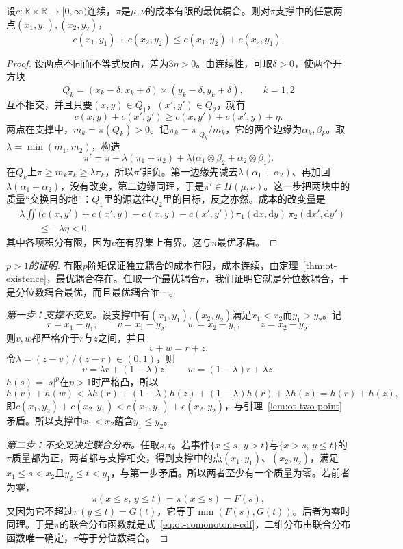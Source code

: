 \begin{lemma}[最优耦合不能局部改进]
\label{lem:ot-two-point}
设$c:\mathbb{R}\times\mathbb{R}\to[0,\infty)$连续，$\pi$是$\mu,\nu$的成本有限的最优耦合。则对$\pi$支撑中的任意两点$(x_1,y_1),(x_2,y_2)$，
\begin{equation}
 c(x_1,y_1)+c(x_2,y_2)\leq c(x_1,y_2)+c(x_2,y_1).
 \label{eq:ot-two-point}
\end{equation}
\end{lemma}

\begin{proof}
设两点不同而不等式反向，差为$3\eta>0$。由连续性，可取$\delta>0$，使两个开方块
\[
 Q_k=(x_k-\delta,x_k+\delta)\times(y_k-\delta,y_k+\delta),\qquad k=1,2
\]
互不相交，并且只要$(x,y)\in Q_1$，$(x',y')\in Q_2$，就有
\[
 c(x,y)+c(x',y')\geq c(x,y')+c(x',y)+\eta .
\]
两点在支撑中，$m_k=\pi(Q_k)>0$。记$\pi_k=\pi|_{Q_k}/m_k$，它的两个边缘为$\alpha_k,\beta_k$。取$\lambda=\min(m_1,m_2)$，构造
\[
 \pi'=\pi-\lambda(\pi_1+\pi_2)+\lambda\bigl(\alpha_1\otimes\beta_2+\alpha_2\otimes\beta_1\bigr).
\]
在$Q_k$上$\pi\geq m_k\pi_k\geq\lambda\pi_k$，所以$\pi'$非负。第一边缘先减去$\lambda(\alpha_1+\alpha_2)$、再加回$\lambda(\alpha_1+\alpha_2)$，没有改变，第二边缘同理，于是$\pi'\in\Pi(\mu,\nu)$。这一步把两块中的质量“交换目的地”：$Q_1$里的源送往$Q_2$里的目标，反之亦然。成本的改变量是
\[
 \begin{aligned}
 &\lambda\iint\bigl(c(x,y')+c(x',y)-c(x,y)-c(x',y')\bigr)\,\pi_1(\mathrm{d}x,\mathrm{d}y)\,\pi_2(\mathrm{d}x',\mathrm{d}y')\\
 &\qquad\leq-\lambda\eta<0 ,
 \end{aligned}
\]
其中各项积分有限，因为$c$在有界集上有界。这与$\pi$最优矛盾。
\end{proof}

\begin{proof}[$p>1$的证明]
有限$p$阶矩保证独立耦合的成本有限，成本连续，由定理~\ref{thm:ot-existence}，最优耦合存在。任取一个最优耦合$\pi$，我们证明它就是分位数耦合，于是分位数耦合最优，而且最优耦合唯一。

\emph{第一步：支撑不交叉。}设支撑中有$(x_1,y_1),(x_2,y_2)$满足$x_1<x_2$而$y_1>y_2$。记
\[
 r=x_1-y_1,\qquad v=x_1-y_2,\qquad w=x_2-y_1,\qquad z=x_2-y_2 .
\]
则$v,w$都严格介于$r$与$z$之间，并且
\[
 v+w=r+z .
\]
令$\lambda=(z-v)/(z-r)\in(0,1)$，则
\[
 v=\lambda r+(1-\lambda)z,\qquad w=(1-\lambda)r+\lambda z .
\]
$h(s)=\lvert s\rvert^{p}$在$p>1$时严格凸，所以
\[
 h(v)+h(w)<\lambda h(r)+(1-\lambda)h(z)+(1-\lambda)h(r)+\lambda h(z)=h(r)+h(z),
\]
即$c(x_1,y_2)+c(x_2,y_1)<c(x_1,y_1)+c(x_2,y_2)$，与引理~\ref{lem:ot-two-point}矛盾。所以支撑中$x_1<x_2$蕴含$y_1\leq y_2$。

\emph{第二步：不交叉决定联合分布。}任取$s,t$。若事件$\{x\leq s,\,y>t\}$与$\{x>s,\,y\leq t\}$的$\pi$质量都为正，两者都与支撑相交，得到支撑中的点$(x_1,y_1)$、$(x_2,y_2)$，满足$x_1\leq s<x_2$且$y_2\leq t<y_1$，与第一步矛盾。所以两者至少有一个质量为零。若前者为零，
\[
 \pi(x\leq s,\,y\leq t)=\pi(x\leq s)=F(s),
\]
又因为它不超过$\pi(y\leq t)=G(t)$，它等于$\min(F(s),G(t))$。后者为零时同理。于是$\pi$的联合分布函数就是式~\eqref{eq:ot-comonotone-cdf}，二维分布由联合分布函数唯一确定，$\pi$等于分位数耦合。
\end{proof}

